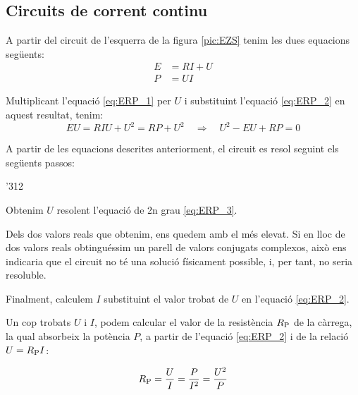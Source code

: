 \begin{center}
   
     \label{pic:EZS}
\end{center}

\subsection{Circuits de corrent continu}

A partir del circuit de l'esquerra de la figura \vref{pic:EZS} tenim les dues equacions següents:
\begin{align}
   E &= R I + U \label{eq:ERP_1} \\
   P &= U I     \label{eq:ERP_2}
\end{align}

Multiplicant l'equació \eqref{eq:ERP_1} per $U$ i substituint l'equació \eqref{eq:ERP_2} en aquest resultat, tenim:
\begin{equation}
   E U = R I U + U^2 = R P + U^2 \quad \Rightarrow \quad U^2 - E U + R P = 0 \label{eq:ERP_3}
\end{equation}

A partir de les equacions descrites anteriorment, el circuit es resol seguint els següents passos:
\begin{dingautolist}{'312}
   \item Obtenim $U$ resolent l'equació de 2n grau \eqref{eq:ERP_3}.
   \item Dels dos valors reals que obtenim, ens quedem amb el més elevat. Si en lloc de dos valors reals obtinguéssim
   un parell de valors conjugats complexos, això ens indicaria que el circuit no té una solució físicament possible, i, per tant, no seria resoluble.
   \item Finalment, calculem $I$ substituint el valor trobat de $U$ en l'equació \eqref{eq:ERP_2}.
\end{dingautolist}

Un cop trobats $U$ i $I$, podem calcular el valor de la resistència
$R_\mathrm{P}$ de la càrrega, la qual absorbeix la potència $P$, a
partir de l'equació \eqref{eq:ERP_2} i de la relació $U =R_\mathrm{P}
I$:

\begin{equation}
   R_\mathrm{P} = \frac{U}{I} = \frac{P}{I^2} = \frac{U^2}{P}
\end{equation}

